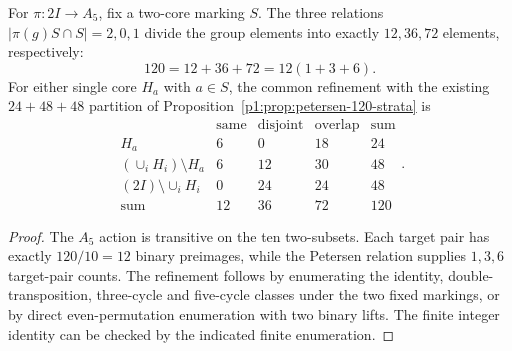 \documentclass[11pt]{article}
\begin{document}
\begin{theorem}
\label{p1:thm:v338-petersen-120-strata}
For $\pi:2I\to A_5$, fix a two-core marking $S$.  The three
relations $|\pi(g)S\cap S|=2,0,1$ divide the group elements into
exactly $12,36,72$ elements, respectively:
\[120=12+36+72=12(1+3+6).\]
For either single core $H_a$ with $a\in S$, the common refinement
with the existing $24+48+48$ partition of
Proposition~\ref{p1:prop:petersen-120-strata} is
\[
 \begin{array}{c|rrr|r}
 &\mathrm{same}&\mathrm{disjoint}&\mathrm{overlap}&\mathrm{sum}\\\hline
 H_a&6&0&18&24\\
 (\cup_iH_i)\setminus H_a&6&12&30&48\\
 (2I)\setminus\cup_iH_i&0&24&24&48\\\hline
 \mathrm{sum}&12&36&72&120
 \end{array}.
\]
\end{theorem}
\begin{proof}
The $A_5$ action is transitive on the ten two-subsets.  Each target
pair has exactly $120/10=12$ binary preimages, while the Petersen
relation supplies $1,3,6$ target-pair counts.  The refinement follows
by enumerating the identity, double-transposition, three-cycle and
five-cycle classes under the two fixed markings, or by direct
even-permutation enumeration with two binary lifts.  The finite
integer identity can be checked by the indicated finite enumeration.
\end{proof}
\end{document}
